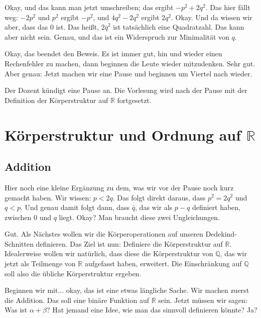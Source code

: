 \begin{spoken-clean}[00:48:12 - 00:50:42]
Okay, und das kann man jetzt umschreiben; das ergibt $-p^2 + 2q^2$. Das hier fällt weg: $-2p^2$ und $p^2$ ergibt $-p^2$, und $4q^2 - 2q^2$ ergibt $2q^2$. Okay. Und da wissen wir aber, dass das $0$ ist. Das heißt, $2\bar{q}^2$ ist tatsächlich eine Quadratzahl. Das kann aber nicht sein. Genau, und das ist ein Widerspruch zur Minimalität von $q$.

Okay, das beendet den Beweis. Es ist immer gut, hin und wieder einen Rechenfehler zu machen, dann beginnen die Leute wieder mitzudenken. Sehr gut. Aber genau: Jetzt machen wir eine Pause und beginnen um Viertel nach wieder.
\end{spoken-clean}

\begin{lecture-break}[Pause]
Der Dozent kündigt eine Pause an. Die Vorlesung wird nach der Pause mit der Definition der Körperstruktur auf $\mathbb{R}$ fortgesetzt.
\end{lecture-break}

\section{Körperstruktur und Ordnung auf \texorpdfstring{$\mathbb{R}$}{R}}

\subsection{Addition}

\begin{spoken-clean}[00:50:42 - 00:52:00]
Hier noch eine kleine Ergänzung zu dem, was wir vor der Pause noch kurz gemacht haben. Wir wissen: $p < 2q$. Das folgt direkt daraus, dass $p^2 = 2q^2$ und $q < p$. Und genau damit folgt dann, dass $\bar{q}$, das wir als $p - q$ definiert haben, zwischen $0$ und $q$ liegt. Okay? Man braucht diese zwei Ungleichungen.

Gut. Als Nächstes wollen wir die Körperoperationen auf unseren Dedekind-Schnitten definieren. Das Ziel ist nun: Definiere die Körperstruktur auf $\mathbb{R}$. Idealerweise wollen wir natürlich, dass diese die Körperstruktur von $\mathbb{Q}$, das wir jetzt als Teilmenge von $\mathbb{R}$ aufgefasst haben, erweitert. Die Einschränkung auf $\mathbb{Q}$ soll also die übliche Körperstruktur ergeben.

Beginnen wir mit... okay, das ist eine etwas längliche Sache. Wir machen zuerst die Addition. Das soll eine binäre Funktion auf $\mathbb{R}$ sein. Jetzt müssen wir sagen: Was ist $\alpha + \beta$? Hat jemand eine Idee, wie man das sinnvoll definieren könnte? Ja?
\end{spoken-clean}

